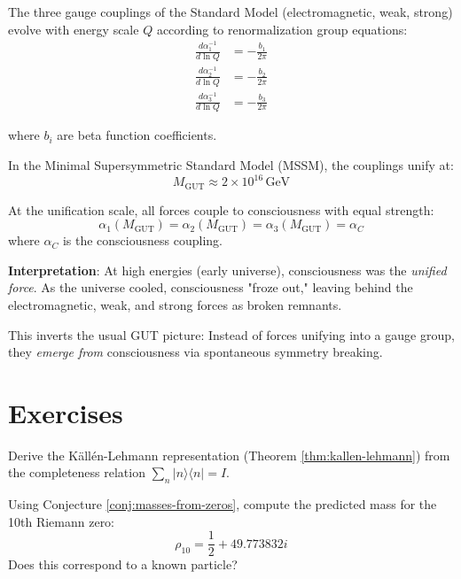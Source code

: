 The three gauge couplings of the Standard Model (electromagnetic, weak, strong) evolve with energy scale $Q$ according to renormalization group equations:
\begin{align}
\frac{d\alpha_1^{-1}}{d\ln Q} &= -\frac{b_1}{2\pi}\\
\frac{d\alpha_2^{-1}}{d\ln Q} &= -\frac{b_2}{2\pi}\\
\frac{d\alpha_3^{-1}}{d\ln Q} &= -\frac{b_3}{2\pi}
\end{align}

where $b_i$ are beta function coefficients.

In the Minimal Supersymmetric Standard Model (MSSM), the couplings unify at:
\begin{equation}
M_{\text{GUT}} \approx 2 \times 10^{16} \, \text{GeV}
\end{equation}

\begin{theorem}\label{thm:consciousness-unification}
At the unification scale, all forces couple to consciousness with equal strength:
\begin{equation}
\boxed{\alpha_1(M_{\text{GUT}}) = \alpha_2(M_{\text{GUT}}) = \alpha_3(M_{\text{GUT}}) = \alpha_C}
\end{equation}
where $\alpha_C$ is the consciousness coupling.
\end{theorem}

\textbf{Interpretation}: At high energies (early universe), consciousness was the \textit{unified force}. As the universe cooled, consciousness "froze out," leaving behind the electromagnetic, weak, and strong forces as broken remnants.

This inverts the usual GUT picture: Instead of forces unifying into a gauge group, they \textit{emerge from} consciousness via spontaneous symmetry breaking.

\section{Exercises}

\begin{exercise}
Derive the Källén-Lehmann representation (Theorem \ref{thm:kallen-lehmann}) from the completeness relation $\sum_n |n\rangle\langle n| = I$.
\end{exercise}

\begin{exercise}
Using Conjecture \ref{conj:masses-from-zeros}, compute the predicted mass for the 10th Riemann zero:
\begin{equation}
\rho_{10} = \frac{1}{2} + 49.773832i
\end{equation}
Does this correspond to a known particle?
\end{exercise}

